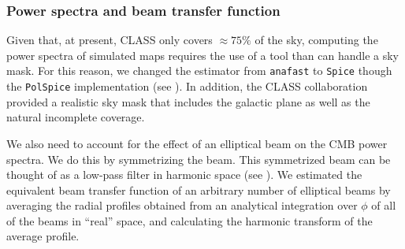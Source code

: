 \documentclass[a4paper,11pt]{article}
\begin{document}

\subsubsection{Power spectra and beam transfer function}

Given that, at present, CLASS only covers $\approx 75\%$ of the sky, computing the power spectra of simulated maps requires the use of a tool than can handle a sky mask. For this reason, we changed the estimator from \texttt{anafast} to \texttt{Spice} though the \texttt{PolSpice} implementation (see \cite{2004MNRAS.350..914C}). In addition, the CLASS collaboration provided a realistic sky mask that includes the galactic plane as well as the natural incomplete coverage. 

We also need to account for the effect of an elliptical beam on the CMB power spectra. We do this by symmetrizing the beam. This symmetrized beam can be thought of as a low-pass filter in harmonic space (see \cite{2003ApJS..148...39P}). We estimated the equivalent beam transfer function of an arbitrary number of elliptical beams by averaging the radial profiles obtained from an analytical integration over $\phi$ of all of the beams in ``real'' space,  and calculating the harmonic transform of the average profile.

\end{document}
